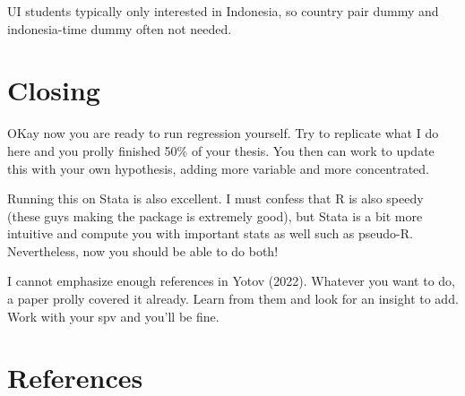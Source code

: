 \documentclass[
  a4paper,
  DIV=11,
  numbers=noendperiod]{scrreprt}
\begin{document}
UI students typically only interested in Indonesia, so country pair
dummy and indonesia-time dummy often not needed.

\hypertarget{closing}{%
\section{Closing}\label{closing}}

OKay now you are ready to run regression yourself. Try to replicate what
I do here and you prolly finished 50\% of your thesis. You then can work
to update this with your own hypothesis, adding more variable and more
concentrated.

Running this on Stata is also excellent. I must confess that R is also
speedy (these guys making the package is extremely good), but Stata is a
bit more intuitive and compute you with important stats as well such as
pseudo-R. Nevertheless, now you should be able to do both!

I cannot emphasize enough references in Yotov (2022). Whatever you want
to do, a paper prolly covered it already. Learn from them and look for
an insight to add. Work with your spv and you'll be fine.

\hypertarget{references}{%
\section*{References}\label{references}}
\end{document}
